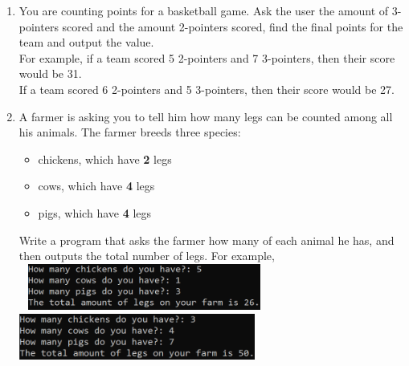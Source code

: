 \documentclass{article}
\begin{document}
\begin{enumerate}
	\item 
		You are counting points for a basketball game. Ask the user the amount of 3-pointers scored 
		and the amount 2-pointers scored, find the final points for the team and output the value.\\
		For example, if a team scored 5 2-pointers and 7 3-pointers, then their score would be 31.\\
		If a team scored 6 2-pointers and 5 3-pointers, then their score would be 27.
	
	\item
		A farmer is asking you to tell him how many legs can be counted among all his animals. 
		The farmer breeds three species:
		\begin{itemize}
			\item chickens, which have \textbf{2} legs
			\item cows, which have \textbf{4} legs
			\item pigs, which have \textbf{4} legs
		\end{itemize}
		Write a program that asks the farmer how many of each animal he has, and then outputs the
		total number of legs.  		
		For example, \\ \ \hfill
		\includegraphics[height = 0.6in]{./imgs/animalLegs_ex1.PNG} \hfill
		\includegraphics[height = 0.6in]{./imgs/animalLegs_ex2.PNG} \hfill \
	
	
	
	

		
		


\end{enumerate}
\end{document}
